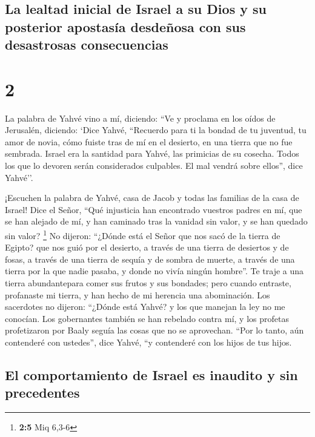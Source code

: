 \hypertarget{la-lealtad-inicial-de-israel-a-su-dios-y-su-posterior-apostasuxeda-desdeuxf1osa-con-sus-desastrosas-consecuencias}{%
\subsection{La lealtad inicial de Israel a su Dios y su posterior
apostasía desdeñosa con sus desastrosas
consecuencias}\label{la-lealtad-inicial-de-israel-a-su-dios-y-su-posterior-apostasuxeda-desdeuxf1osa-con-sus-desastrosas-consecuencias}}

\hypertarget{section-1}{%
\section{2}\label{section-1}}

 La palabra de Yahvé vino a mí, diciendo: 
``Ve y proclama en los oídos de Jerusalén, diciendo: `Dice Yahvé,
``Recuerdo para ti la bondad de tu juventud, tu amor de novia, cómo
fuiste tras de mí en el desierto, en una tierra que no fue sembrada.
 Israel era la santidad para Yahvé, las primicias de su
cosecha. Todos los que lo devoren serán considerados culpables. El mal
vendrá sobre ellos'', dice Yahvé''.

 ¡Escuchen la palabra de Yahvé, casa de Jacob y todas las
familias de la casa de Israel!  Dice el Señor, ``Qué
injusticia han encontrado vuestros padres en mí, que se han alejado de
mí, y han caminado tras la vanidad sin valor, y se han quedado sin
valor? \footnote{\textbf{2:5} Miq 6,3-6}  No dijeron:
``¿Dónde está el Señor que nos sacó de la tierra de Egipto? que nos guió
por el desierto, a través de una tierra de desiertos y de fosas, a
través de una tierra de sequía y de sombra de muerte, a través de una
tierra por la que nadie pasaba, y donde no vivía ningún hombre''.
 Te traje a una tierra abundantepara comer sus frutos y
sus bondades; pero cuando entraste, profanaste mi tierra, y han hecho de
mi herencia una abominación.  Los sacerdotes no dijeron:
``¿Dónde está Yahvé? y los que manejan la ley no me conocían. Los
gobernantes también se han rebelado contra mí, y los profetas
profetizaron por Baaly seguía las cosas que no se aprovechan.
 ``Por lo tanto, aún contenderé con ustedes'', dice Yahvé,
``y contenderé con los hijos de tus hijos.

\hypertarget{el-comportamiento-de-israel-es-inaudito-y-sin-precedentes}{%
\subsection{El comportamiento de Israel es inaudito y sin
precedentes}\label{el-comportamiento-de-israel-es-inaudito-y-sin-precedentes}}

